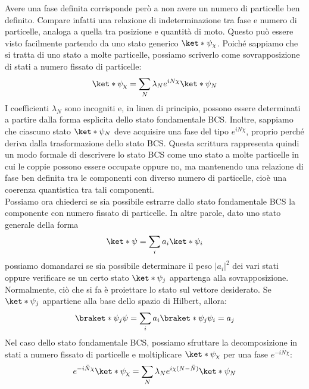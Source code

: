 Avere una fase definita corrisponde però a non avere un numero di particelle ben definito. Compare infatti una relazione di indeterminazione tra fase e numero di particelle, analoga a quella tra posizione e quantità di moto. Questo può essere visto facilmente partendo da uno stato generico $\ket*{\psi_{\chi}}$. Poiché sappiamo che si tratta di uno stato a molte particelle, possiamo scriverlo come sovrapposizione di stati a numero fissato di particelle:
\begin{equation*}
   \ket*{\psi_{\chi}}
   =
   \sum_N
   \lambda_N e^{i N \chi}
   \ket*{\psi_N}
\end{equation*}
I coefficienti $\lambda_N$ sono incogniti e, in linea di principio, possono essere determinati a partire dalla forma esplicita dello stato fondamentale BCS. Inoltre, sappiamo che ciascuno stato $\ket*{\psi_N}$ deve acquisire una fase del tipo $e^{i N \chi}$, proprio perché deriva dalla trasformazione dello stato BCS. Questa scrittura rappresenta quindi un modo formale di descrivere lo stato BCS come uno stato a molte particelle in cui le coppie possono essere occupate oppure no, ma mantenendo una relazione di fase ben definita tra le componenti con diverso numero di particelle, cioè una coerenza quantistica tra tali componenti.\\
Possiamo ora chiederci se sia possibile estrarre dallo stato fondamentale BCS la componente con numero fissato di particelle. In altre parole, dato uno stato generale della forma
\begin{equation*}
   \ket*{\psi}
   =
   \sum_i a_i \ket*{\psi_i}
\end{equation*}
possiamo domandarci se sia possibile determinare il peso $|a_i|^2$ dei vari stati oppure verificare se un certo stato $\ket*{\psi_j}$ appartenga alla sovrapposizione.\\
Normalmente, ciò che si fa è proiettare lo stato sul vettore desiderato. Se $\ket*{\psi_j}$ appartiene alla base dello spazio di Hilbert, allora:
\begin{equation*}
   \braket*{\psi_j}{\psi}
   =\sum_i a_i \braket*{\psi_j}{\psi_i}
   =a_j
\end{equation*}
Nel caso dello stato fondamentale BCS, possiamo sfruttare la decomposizione in stati a numero fissato di particelle e moltiplicare $\ket*{\psi_{\chi}}$ per una fase $e^{-i \bar{N} \chi}$:
\begin{equation*}
   e^{-i \bar{N} \chi}
   \ket*{\psi_{\chi}}
   =
   \sum_N
   \lambda_N
   e^{i\chi (N-\bar{N})}
   \ket*{\psi_N}
\end{equation*}
